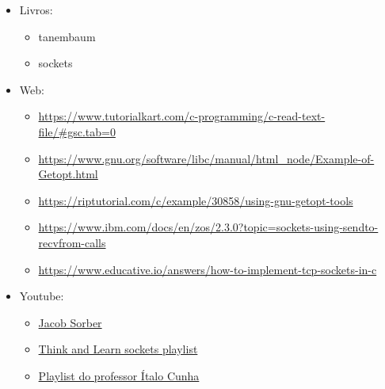 \documentclass{article}
\begin{document}
\begin{itemize}
    \item Livros:
          \begin{itemize}
              \item tanembaum
              \item sockets
          \end{itemize}

    \item Web:
          \begin{itemize}
              \item
                    \url{https://www.tutorialkart.com/c-programming/c-read-text-file/#gsc.tab=0}
              \item
                    \url{https://www.gnu.org/software/libc/manual/html_node/Example-of-Getopt.html}
              \item
                    \url{https://riptutorial.com/c/example/30858/using-gnu-getopt-tools}
              \item 
                    \url{https://www.ibm.com/docs/en/zos/2.3.0?topic=sockets-using-sendto-recvfrom-calls}
              \item
                    \url{https://www.educative.io/answers/how-to-implement-tcp-sockets-in-c}    
            \end{itemize}

    \item Youtube:
          \begin{itemize}
              \item \href{https://www.youtube.com/@JacobSorber}{Jacob Sorber}
              \item \href{https://www.youtube.com/watch?v=_lQ-3S4fJ0U&list=PLPyaR5G9aNDvs6TtdpLcVO43_jvxp4emI}{Think and Learn sockets playlist}
              \item \href{https://www.youtube.com/watch?v=tJ3qNtv0HVs&t=2s}{Playlist do professor Ítalo Cunha}
            \end{itemize}

\end{itemize}
\end{document}

